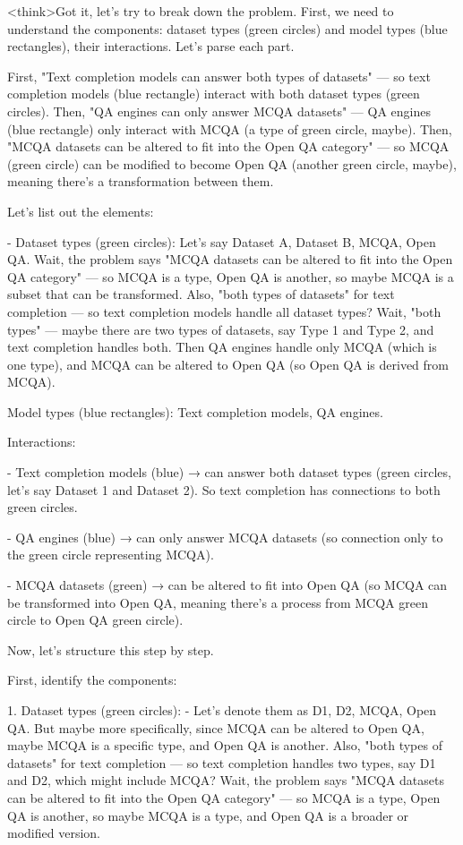 <think>Got it, let's try to break down the problem. First, we need to understand the components: dataset types (green circles) and model types (blue rectangles), their interactions. Let's parse each part.

First, "Text completion models can answer both types of datasets" — so text completion models (blue rectangle) interact with both dataset types (green circles). Then, "QA engines can only answer MCQA datasets" — QA engines (blue rectangle) only interact with MCQA (a type of green circle, maybe). Then, "MCQA datasets can be altered to fit into the Open QA category" — so MCQA (green circle) can be modified to become Open QA (another green circle, maybe), meaning there's a transformation between them.

Let's list out the elements:

- Dataset types (green circles): Let's say Dataset A, Dataset B, MCQA, Open QA. Wait, the problem says "MCQA datasets can be altered to fit into the Open QA category" — so MCQA is a type, Open QA is another, so maybe MCQA is a subset that can be transformed. Also, "both types of datasets" for text completion — so text completion models handle all dataset types? Wait, "both types" — maybe there are two types of datasets, say Type 1 and Type 2, and text completion handles both. Then QA engines handle only MCQA (which is one type), and MCQA can be altered to Open QA (so Open QA is derived from MCQA).

Model types (blue rectangles): Text completion models, QA engines.

Interactions:

- Text completion models (blue) → can answer both dataset types (green circles, let's say Dataset 1 and Dataset 2). So text completion has connections to both green circles.

- QA engines (blue) → can only answer MCQA datasets (so connection only to the green circle representing MCQA).

- MCQA datasets (green) → can be altered to fit into Open QA (so MCQA can be transformed into Open QA, meaning there's a process from MCQA green circle to Open QA green circle).

Now, let's structure this step by step.

First, identify the components:

1. Dataset types (green circles):
   - Let's denote them as D1, D2, MCQA, Open QA. But maybe more specifically, since MCQA can be altered to Open QA, maybe MCQA is a specific type, and Open QA is another. Also, "both types of datasets" for text completion — so text completion handles two types, say D1 and D2, which might include MCQA? Wait, the problem says "MCQA datasets can be altered to fit into the Open QA category" — so MCQA is a type, Open QA is another, so maybe MCQA is a type, and Open QA is a broader or modified version.

